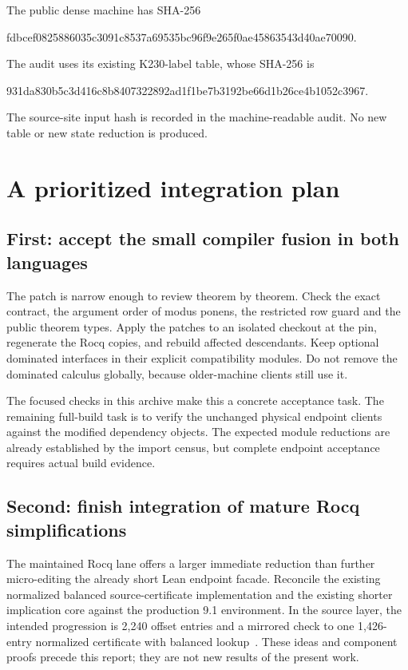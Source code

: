 \documentclass[11pt]{article}
\theoremstyle{definition}\newtheorem{definition}[theorem]{Definition}
\begin{document}
The public dense machine has SHA-256
\begin{center}\small\ttfamily
fdbcef0825886035c3091c8537a69535bc96f9e265f0ae45863543d40ae70090.
\end{center}
The audit uses its existing K230-label table, whose SHA-256 is
\begin{center}\small\ttfamily
931da830b5c3d416c8b8407322892ad1f1be7b3192be66d1b26ce4b1052c3967.
\end{center}
The source-site input hash is recorded in the machine-readable audit. No new
table or new state reduction is produced.

\section{A prioritized integration plan}

\subsection{First: accept the small compiler fusion in both languages}

The patch is narrow enough to review theorem by theorem. Check the exact
contract, the argument order of modus ponens, the restricted row guard and the
public theorem types. Apply the patches to an isolated checkout at the pin,
regenerate the Rocq copies, and rebuild affected descendants. Keep optional
dominated interfaces in their explicit compatibility modules. Do not remove
the dominated calculus globally, because older-machine clients still use it.

The focused checks in this archive make this a concrete acceptance task. The
remaining full-build task is to verify the unchanged physical endpoint clients
against the modified dependency objects. The expected module reductions are
already established by the import census, but complete endpoint acceptance
requires actual build evidence.

\subsection{Second: finish integration of mature Rocq simplifications}

The maintained Rocq lane offers a larger immediate reduction than further
micro-editing the already short Lean endpoint facade. Reconcile the existing
normalized balanced source-certificate implementation and the existing shorter
implication core against the production 9.1 environment. In the source layer,
the intended progression is 2,240 offset entries and a mirrored check to one
1,426-entry normalized certificate with balanced lookup~\cite{rocqsource,priorindex}.
These ideas and component proofs precede this report; they are not new results
of the present work.
\end{document}
